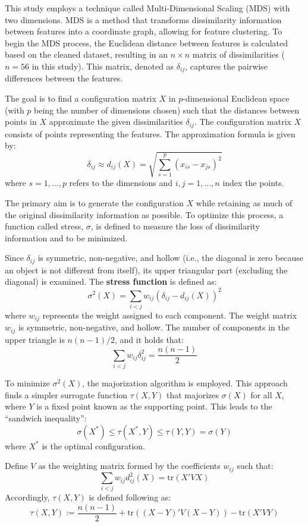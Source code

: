This study employs a technique called Multi-Dimensional Scaling (MDS) with two dimensions. MDS is a method that transforms dissimilarity information between features into a coordinate graph, allowing for feature clustering. To begin the MDS process, the Euclidean distance between features is calculated based on the cleaned dataset, resulting in an $n \times n$ matrix of dissimilarities ($n = 56$ in this study). This matrix, denoted as $\delta_{ij}$, captures the pairwise differences between the features.

The goal is to find a configuration matrix $X$ in $p$-dimensional Euclidean space (with $p$ being the number of dimensions chosen) such that the distances between points in $X$ approximate the given dissimilarities $\delta_{ij}$. The configuration matrix $X$ consists of points representing the features. The approximation formula is given by:
\[
\delta_{ij} \approx d_{ij}(X) = \sqrt{\sum_{s=1}^{p} (x_{is} - x_{js})^2}
\]
where $s = 1, \ldots, p$ refers to the dimensions and $i, j = 1, \ldots, n$ index the points.

The primary aim is to generate the configuration $X$ while retaining as much of the original dissimilarity information as possible. To optimize this process, a function called stress, $\sigma$, is defined to measure the loss of dissimilarity information and to be minimized.

Since $\delta_{ij}$ is symmetric, non-negative, and hollow (i.e., the diagonal is zero because an object is not different from itself), its upper triangular part (excluding the diagonal) is examined. The \textbf{stress function} is defined as:
\begin{equation} \label{eq:stress}
	\sigma^2(X) = \sum_{i<j} w_{ij} (\delta_{ij} - d_{ij}(X))^2
\end{equation}
where $w_{ij}$ represents the weight assigned to each component. The weight matrix $w_{ij}$ is symmetric, non-negative, and hollow. The number of components in the upper triangle is $n(n-1)/2$, and it holds that:
\[
\sum_{i<j} w_{ij} \delta_{ij}^2 = \frac{n(n-1)}{2}
\]

To minimize $\sigma^2(X)$, the majorization algorithm is employed. This approach finds a simpler surrogate function $\tau(X, Y)$ that majorizes $\sigma(X)$ for all $X$, where $Y$ is a fixed point known as the supporting point. This leads to the ``sandwich inequality'':
\[
\sigma(X^*) \leq \tau(X^*, Y) \leq \tau(Y, Y) = \sigma(Y)
\]
where $X^*$ is the optimal configuration.

Define $V$ as the weighting matrix formed by the coefficients $w_{ij}$ such that:
\[
\sum_{i<j} w_{ij} d_{ij}^2(X) = \text{tr}(X' V X)
\]
Accordingly, $\tau(X, Y)$ is defined following \citet{de1980multidimensional} as:
\[
\tau(X, Y) := \frac{n(n-1)}{2} + \text{tr}((X - Y)' V (X - Y)) - \text{tr}(X' V Y)
\]


